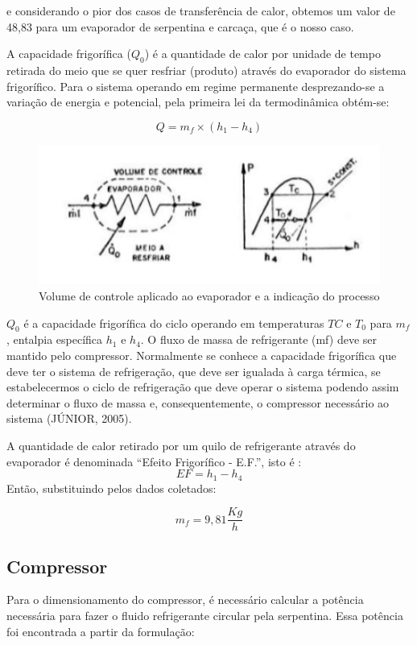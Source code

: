 	e considerando o pior dos casos de transferência de calor, obtemos um valor de 48,83 para um evaporador de serpentina e carcaça, que é o nosso caso.
	
	A capacidade frigorífica ($Q_0$) é a quantidade de calor por unidade de tempo retirada do meio que se quer resfriar (produto) através do evaporador do sistema frigorífico. Para o sistema operando em regime permanente desprezando-se a variação de energia e potencial, pela primeira lei da termodinâmica obtém-se: 
	
	\begin{equation}
	Q=m_f \times (h_1-h_4)
	\end{equation}

	\begin{figure}[H]
		\begin{center}
			\includegraphics[scale =1]{figuras/Volume_Evaporador}
			\caption{Volume de controle aplicado ao evaporador e a indicação do processo }
		\end{center}
	\end{figure}
	
	$Q_0$ é a capacidade frigorífica  do ciclo operando em temperaturas $TC$ e $T_0$ para $m_f$, entalpia específica $h_1$ e  $h_4$. O fluxo de massa de refrigerante (mf) deve ser mantido pelo compressor. Normalmente se conhece a capacidade frigorífica que deve ter o sistema de refrigeração, que deve ser igualada à carga térmica, se estabelecermos o ciclo de refrigeração que deve operar o sistema podendo assim determinar o fluxo de massa e, consequentemente, o compressor necessário ao sistema (JÚNIOR, 2005).
	
	 A quantidade de calor retirado por um quilo de refrigerante através do evaporador é denominada “Efeito Frigorífico - E.F.”, isto é :
	 \begin{equation}
	 EF = h_1-h_4
	 \end{equation}
	 Então, substituindo pelos dados coletados:
	 
	 $$
	 m_f=9,81 \frac{Kg}{h}
	 $$
	 \subsection{Compressor}
	 Para o dimensionamento do compressor, é necessário calcular a potência necessária para fazer o fluido refrigerante circular pela serpentina. Essa potência foi encontrada a partir da formulação: 
	 
